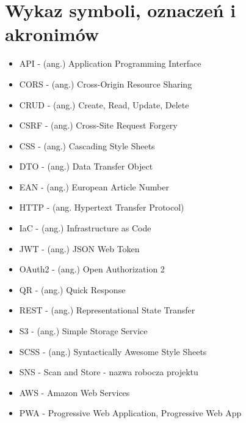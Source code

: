 \documentclass[../main.tex]{subfiles}
\begin{document}
\section{Wykaz symboli, oznaczeń i akronimów}
        \begin{itemize}
            \item API - (ang.) Application Programming Interface
            \item CORS - (ang.) Cross-Origin Resource Sharing
            \item CRUD - (ang.) Create, Read, Update, Delete
            \item CSRF - (ang.) Cross-Site Request Forgery
            \item CSS - (ang.) Cascading Style Sheets
            \item DTO - (ang.) Data Transfer Object
            \item EAN - (ang.) European Article Number
            \item HTTP - (ang. Hypertext Transfer Protocol)
            \item IaC - (ang.) Infrastructure as Code 
            \item JWT - (ang.) JSON Web Token
            \item OAuth2 - (ang.) Open Authorization 2
            \item QR - (ang.) Quick Response
            \item REST - (ang.) Representational State Transfer
            \item S3 - (ang.) Simple Storage Service
            \item SCSS - (ang.) Syntactically Awesome Style Sheets
            \item SNS - Scan and Store - nazwa robocza projektu
            \item AWS - Amazon Web Services
            \item PWA - Progressive Web Application, Progressive Web App
        \end{itemize}
\end{document}
